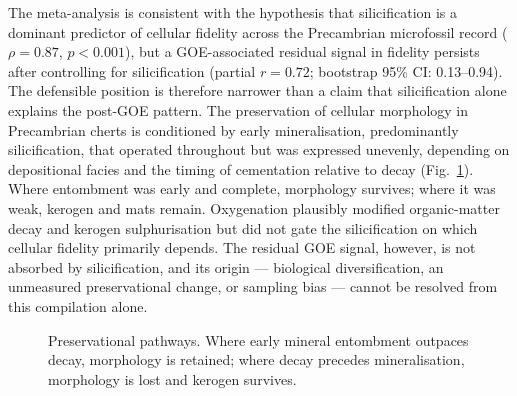 \documentclass[11pt]{article}
\begin{document}
The meta-analysis is consistent with the hypothesis that silicification is a dominant predictor of
cellular fidelity across the Precambrian microfossil record ($\rho = 0.87$, $p < 0.001$), but a
GOE-associated residual signal in fidelity persists after controlling for silicification (partial
$r = 0.72$; bootstrap 95\% CI: 0.13--0.94). The defensible position is therefore narrower than a
claim that silicification alone explains the post-GOE pattern. The preservation of cellular morphology
in Precambrian cherts is conditioned by early mineralisation, predominantly silicification, that
operated throughout but was expressed unevenly, depending on depositional facies and the timing of
cementation relative to decay (Fig.~\ref{fig:model}). Where entombment was early and complete,
morphology survives; where it was weak, kerogen and mats remain. Oxygenation plausibly modified
organic-matter decay and kerogen sulphurisation \citep{Lepot2009,Decraene2021} but did not gate the
silicification on which cellular fidelity primarily depends. The residual GOE signal, however, is
not absorbed by silicification, and its origin --- biological diversification, an unmeasured
preservational change, or sampling bias --- cannot be resolved from this compilation alone.

\begin{figure}[t]
\centering
{}
\caption{Preservational pathways. Where early mineral entombment outpaces decay, morphology is
retained; where decay precedes mineralisation, morphology is lost and kerogen survives.}
\label{fig:model}
\end{figure}
\end{document}
